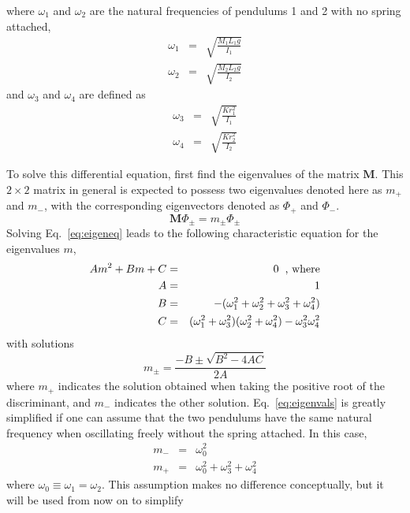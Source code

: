\documentclass{revtex4}
\begin{document}
where $\omega_1$ and $\omega_2$ are the natural frequencies of pendulums
1 and 2 with no spring attached,
\begin{eqnarray}
\omega_1 &=& \sqrt{\frac{M_1L_1g}{I_1}} \label{eq:omega1} \\
\omega_2 &=& \sqrt{\frac{M_2L_2g}{I_2}} \label{eq:omega2}
\end{eqnarray}
and $\omega_3$ and $\omega_4$ are defined as
\begin{eqnarray}
\omega_3 &=& \sqrt{\frac{Kr_1^2}{I_1}} \label{eq:omega3} \\
\omega_4 &=& \sqrt{\frac{Kr_2^2}{I_2}} \label{eq:omega4}
\end{eqnarray}

To solve this differential equation, first find the eigenvalues of
the matrix ${\mathbf M}$.  This $2\times 2$ matrix in general is expected
to possess two eigenvalues denoted here as $m_+$ and $m_-$, with the
corresponding eigenvectors denoted as $\Phi_+$ and $\Phi_-$.
\begin{equation}
{\mathbf M}\Phi_{\pm} = m_{\pm} \Phi_{\pm} \label{eq:eigeneq}
\end{equation}
Solving Eq.~\ref{eq:eigeneq} leads to the following characteristic
equation for the eigenvalues $m$,
\begin{eqnarray}
Am^2 + Bm + C &=& 0\hspace*{2mm}\mbox{, where} \\
A &=& 1 \nonumber \\
B &=& -(\omega_1^2+\omega_2^2+\omega_3^2+\omega_4^2 \nonumber) \\
C &=& (\omega_1^2+\omega_3^2)(\omega_2^2+\omega_4^2) - \omega_3^2\omega_4^2
\nonumber
\end{eqnarray}
with solutions
\begin{equation}
m_{\pm} = \frac{-B \pm \sqrt{B^2-4AC}}{2A} \label{eq:eigenvals}
\end{equation}
where $m_+$ indicates the solution obtained when taking the positive
root of the discriminant, and $m_-$ indicates the other solution.
Eq.~\ref{eq:eigenvals} is greatly simplified if one can assume
that the two pendulums have the same natural frequency when oscillating
freely without the spring attached.  In this case,
\begin{eqnarray}
m_- &=& \omega_0^2 \\
m_+ &=& \omega_0^2 +\omega_3^2+\omega_4^2
\end{eqnarray}
where $\omega_0\equiv \omega_1=\omega_2$.  This assumption makes no
difference conceptually, but it will be used from now on to simplify
\end{document}
